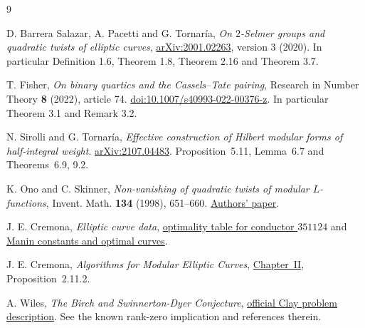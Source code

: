 \documentclass[11pt]{article}
\begin{document}
\begin{thebibliography}{9}

D. Barrera Salazar, A. Pacetti and G. Tornar\'ia,
\emph{On $2$-Selmer groups and quadratic twists
of elliptic curves},
\href{https://arxiv.org/abs/2001.02263}{arXiv:2001.02263}, version 3 (2020).
In particular Definition 1.6, Theorem 1.8,
Theorem 2.16 and Theorem 3.7.

T. Fisher,
\emph{On binary quartics and the Cassels--Tate pairing},
Research in Number Theory \textbf{8} (2022),
article 74.
\href{https://doi.org/10.1007/s40993-022-00376-z}{doi:10.1007/s40993-022-00376-z}.
In particular Theorem 3.1 and Remark 3.2.

N. Sirolli and G. Tornar\'ia,
\emph{Effective construction of Hilbert modular forms of half-integral weight}.
\href{https://arxiv.org/abs/2107.04483}{arXiv:2107.04483}.
Proposition~5.11, Lemma~6.7 and Theorems~6.9, 9.2.

K. Ono and C. Skinner,
\emph{Non-vanishing of quadratic twists of modular $L$-functions},
Invent. Math. \textbf{134} (1998), 651--660.
\href{https://uva.theopenscholar.com/files/ken-ono/files/037.pdf}{Authors' paper}.

J. E. Cremona, \emph{Elliptic curve data},
\href{https://github.com/JohnCremona/ecdata/blob/master/opt_man/opt_man.350000-359999}{optimality table for conductor $351124$}
and \href{https://johncremona.github.io/ecdata/manin.txt}{Manin constants and optimal curves}.

J. E. Cremona, \emph{Algorithms for Modular Elliptic Curves},
\href{https://johncremona.github.io/book/fulltext/chapter2.pdf}{Chapter~II}, Proposition~2.11.2.

A. Wiles, \emph{The Birch and Swinnerton-Dyer Conjecture},
\href{https://www.claymath.org/wp-content/uploads/2022/05/birchswin.pdf}{official Clay problem description}.
See the known rank-zero implication and references therein.

\end{thebibliography}
\end{document}
